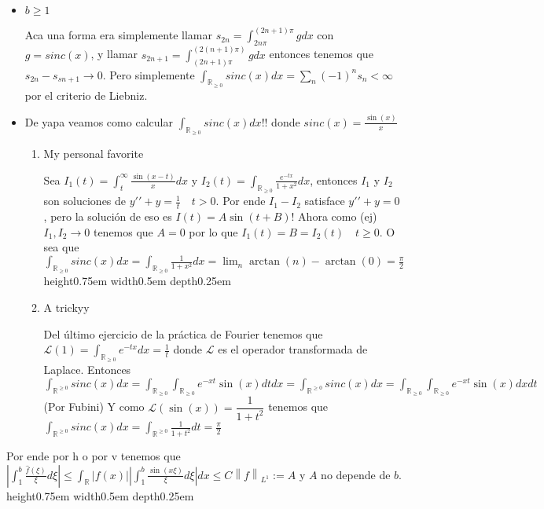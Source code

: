 \documentclass[11pt,a4paper,oneside]{article}
\newcommand{\R}{{\mathbb{R}}}
\newcommand\norm[1]{\left\lVert#1\right\rVert}
\newenvironment{proof}[1][Demostraci\'on]{\begin{trivlist}
\item[\hskip \labelsep {\bfseries #1}]}{\end{trivlist}}
\newcommand{\qed}{\nobreak \ifvmode \relax \else
      \ifdim\lastskip<1.5em \hskip-\lastskip
      \hskip1.5em plus0em minus0.5em \fi \nobreak
      \vrule height0.75em width0.5em depth0.25em\fi}
\begin{document}
\begin{proof}
\begin{enumerate}
\begin{itemize}
\item {$b \geq 1$}

Aca una forma era simplemente llamar $s_{2n} = \int_{2n \pi}^{(2n+1)\pi}{g dx}$ con $g = sinc(x)$, y llamar $s_{2n+1} = \int_{(2n+1)\pi}^{(2(n+1) \pi)}{g dx}$ entonces tenemos que $s_{2n} - s_{sn+1} \rightarrow 0$. Pero simplemente $\int_{\R_{\geq 0}} {sinc(x) dx} = \sum_{n}{(-1)^n s_n} < \infty $ por el criterio de Liebniz.

\item {De yapa veamos como calcular $\int_{\R_{\geq 0}}{sinc(x) dx}!!$ donde $sinc(x) = \frac{\sin(x)}{x}$}

\begin{enumerate}

\item {My personal favorite}

Sea $I_1(t) = \int_{t}^{\infty}{\frac{\sin(x-t)}{x} dx}$ y $I_2(t) = \int_{\R_{\geq 0}}{\frac{e^{-tx}}{1 + x^2} dx}$, entonces $I_1$ y $I_2$ son soluciones de $y\prime \prime + y = \frac{1}{t} \quad t > 0$. Por ende $I_1 - I_2$ satisface $y \prime \prime + y = 0$, pero la soluci\'on de eso es $I(t) = A\sin(t + B)$! Ahora como (ej) $I_1,I_2 \rightarrow 0$ tenemos que $A = 0$ por lo que $I_1(t) = B = I_2(t) \quad t\geq 0$. O sea que $\int_{\R_{\geq 0}}{sinc(x)dx} = \int_{\R_{\geq 0}}{\frac{1}{1 + x^2}dx} = \lim_{n}{\arctan(n) - \arctan(0)} = \frac{\pi}{2}$ \qed

\item {A trickyy}

Del \'ultimo ejercicio de la pr\'actica de Fourier tenemos que $\mathcal{L}(1) = \int_{\R_{\geq 0}}{e^{-tx}dx} = \frac{1}{t}$ donde $\mathcal{L}$ es el operador transformada de Laplace. Entonces $\int_{\R^{\geq 0}}{sinc(x) dx} = \int_{\R_{\geq 0}}{\int_{\R_{\geq 0}}{e^{-xt}\sin(x)dt} dx} = \int_{\R^{\geq 0}}{sinc(x) dx} = \int_{\R_{\geq 0}}{\int_{\R_{\geq 0}}{e^{-xt}\sin(x)dx} dt}$ (Por Fubini) Y como $\mathcal{L}(\sin(x)) = \dfrac{1}{1+t^2}$ tenemos que $\int_{\R^{\geq 0}}{sinc(x) dx} = \int_{\R^{\geq 0}}{\frac{1}{1+t^2} dt} = \frac{\pi}{2} $

\end{enumerate}

\end{itemize}

Por ende por h o por v tenemos que $ | \int_{1}^{b}{\frac{\hat{f}(\xi)}{\xi}d\xi}| \leq \int_{\R}{|f(x)| |\int_{1}^{b}{\frac{\sin(x \xi)}{\xi}d\xi}| dx} \leq C \norm{f}_{L^1} := A$ y $A$ no depende de $b$.\qed


\end{enumerate}
\end{proof}
\end{document}
